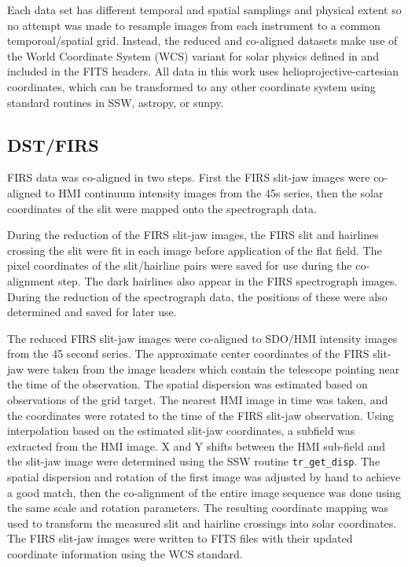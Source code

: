 \documentclass[twocolumn]{aastex62}
\begin{document}
Each data set has different temporal and spatial samplings and physical extent so no attempt was made to resample images from each instrument to a common temporoal/spatial grid.  
Instead, the reduced and co-aligned datasets make use of the World Coordinate System (WCS) variant for solar physics defined in \citet{2006Thompson} and included in the FITS headers.  
All data in this work uses helioprojective-cartesian coordinates, which can be transformed to any other coordinate system using standard routines in SSW, astropy, or sunpy.\par

\subsection{DST/FIRS}
FIRS data was co-aligned in two steps. First the FIRS slit-jaw images were co-aligned to HMI continuum intensity images from the 45s series, then the solar coordinates of the slit were mapped onto the spectrograph data.

During the reduction of the FIRS slit-jaw images, the FIRS slit and hairlines crossing the slit were fit in each image before application of the flat field.  The pixel coordinates of the slit/hairline pairs were saved for use during the co-alignment step.  The dark hairlines also appear in the FIRS spectrograph images.  During the reduction of the spectrograph data, the positions of these were also determined and saved for later use.

The reduced FIRS slit-jaw images were co-aligned to SDO/HMI intensity images from the 45 second series.  The approximate center coordinates of the FIRS slit-jaw were taken from the image headers which contain the telescope pointing near the time of the observation.  The spatial dispersion was estimated based on observations of the grid target.  The nearest HMI image in time was taken, and the coordinates were rotated to the time of the FIRS slit-jaw observation.  Using interpolation based on the estimated slit-jaw coordinates, a subfield was extracted from the HMI image.  X and Y shifts between the HMI sub-field and the slit-jaw image were determined using the SSW routine \verb+tr_get_disp+.  The spatial dispersion and rotation of the first image was adjusted by hand to achieve a good match, then the co-alignment of the entire image sequence was done using the same scale and rotation parameters.  The resulting coordinate mapping was used to transform the measured slit and hairline crossings into solar coordinates.  The FIRS slit-jaw images were written to FITS files with their updated coordinate information using the WCS standard.
\end{document}
